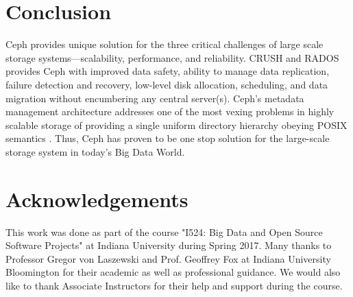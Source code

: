 \documentclass[9pt,twocolumn,twoside]{styles/osajnl}
\begin{document}
\section{Conclusion}
Ceph provides unique solution for the three critical challenges of
large scale storage systems—scalability, performance, and
reliability. CRUSH and RADOS provides Ceph with improved data safety,
ability to manage data replication, failure detection and recovery,
low-level disk allocation, scheduling, and data migration without
encumbering any central server(s). Ceph’s metadata management
architecture addresses one of the most vexing problems in highly
scalable storage of providing a single uniform directory hierarchy
obeying POSIX semantics \cite{paper-Ceph}. Thus, Ceph has proven to be
one stop solution for the large-scale storage system in today's Big
Data World.

\section*{Acknowledgements}

This work was done as part of the course "I524: Big Data and Open
Source Software Projects" at Indiana University during Spring
2017. Many thanks to Professor Gregor von Laszewski and Prof. Geoffrey
Fox at Indiana University Bloomington for their academic as well as
professional guidance. We would also like to thank Associate
Instructors for their help and support during the course.


\end{document}
